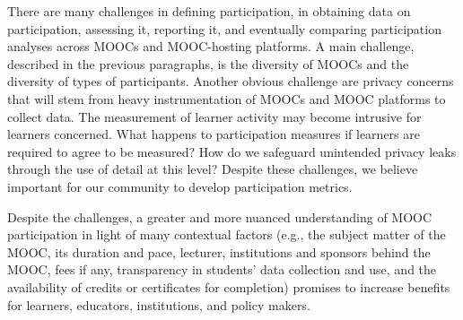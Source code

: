  There are many challenges in defining participation, in
obtaining data on participation, assessing it, reporting it, and
eventually comparing participation analyses across MOOCs and
MOOC-hosting platforms. A main challenge, described in the previous
paragraphs, is the diversity of MOOCs and the diversity of types of
participants. Another obvious challenge are privacy concerns that will
stem from heavy instrumentation of MOOCs and MOOC platforms to collect
data. The measurement of learner activity may become intrusive for
learners concerned. What happens to participation measures if learners
are required to agree to be measured? How do we safeguard unintended
privacy leaks through the use of detail at this level?  Despite these
challenges, we believe important for our community to develop
participation metrics. 


Despite the challenges, a greater and more nuanced understanding of MOOC
participation in light of many contextual factors (e.g., the subject
matter of the MOOC, its duration and pace, lecturer, institutions and
sponsors behind the MOOC, fees if any, transparency in students’ data
collection and use, and the availability of credits or certificates for
completion) promises to increase benefits for learners, educators,
institutions, and policy makers.


